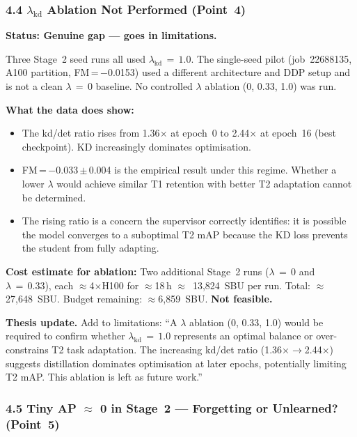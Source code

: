 \subsubsection*{4.4 $\lambda_{\mathrm{kd}}$ Ablation Not Performed (Point~4)}

\textbf{Status: Genuine gap --- goes in limitations.}

\vspace{0.5em}
\noindent Three Stage~2 seed runs all used $\lambda_{\mathrm{kd}}\,=\,1.0$.
The single-seed pilot (job~22688135, A100 partition, FM\,=\,$-$0.0153) used
a different architecture and DDP setup and is not a clean $\lambda\,=\,0$
baseline. No controlled $\lambda$ ablation (0, 0.33, 1.0) was run.

\vspace{0.5em}
\noindent\textbf{What the data does show:}
\begin{itemize}
    \item The kd/det ratio rises from 1.36$\times$ at epoch~0 to 2.44$\times$
    at epoch~16 (best checkpoint). KD increasingly dominates optimisation.
    \item FM\,=\,$-$0.033\,$\pm$\,0.004 is the empirical result under this
    regime. Whether a lower $\lambda$ would achieve similar T1 retention
    with better T2 adaptation cannot be determined.
    \item The rising ratio is a concern the supervisor correctly identifies:
    it is possible the model converges to a suboptimal T2 mAP because the
    KD loss prevents the student from fully adapting.
\end{itemize}

\noindent\textbf{Cost estimate for ablation:} Two additional Stage~2 runs
($\lambda\,=\,0$ and $\lambda\,=\,0.33$), each $\approx$4$\times$H100
for $\approx$18\,h $\approx$~13,824~SBU per run. Total: $\approx$27,648~SBU.
Budget remaining: $\approx$6,859~SBU. \textbf{Not feasible.}

\vspace{0.5em}
\noindent\textbf{Thesis update.} Add to limitations: ``A $\lambda$ ablation
(0, 0.33, 1.0) would be required to confirm whether $\lambda_{\mathrm{kd}}\,=\,1.0$
represents an optimal balance or over-constrains T2 task adaptation. The
increasing kd/det ratio (1.36$\times$$\to$2.44$\times$) suggests distillation
dominates optimisation at later epochs, potentially limiting T2 mAP. This
ablation is left as future work.''

\subsubsection*{4.5 Tiny AP $\approx$ 0 in Stage~2 --- Forgetting or Unlearned? (Point~5)}

